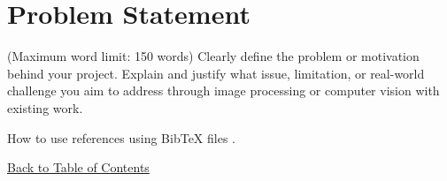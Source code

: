 \section{Problem Statement}
(Maximum word limit: 150 words)
Clearly define the problem or motivation behind your project. Explain and justify what issue, limitation, or real-world challenge you aim to address through image processing or computer vision with existing work.

How to use references using BibTeX files \cite{gonzalez2008digital}.  

\hyperref[contents]{\small Back to Table of Contents}
\newpage
